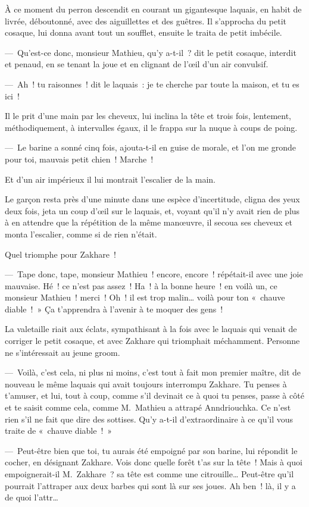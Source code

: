 \documentclass[french,twoside]{book} %
\begin{document}
À ce moment du perron descendit en courant un gigantesque laquais, en habit de livrée, déboutonné, avec des aiguillettes et des guêtres. Il s’approcha du petit cosaque, lui donna avant tout un soufflet, ensuite le traita de petit imbécile.\par
— Qu’est-ce donc, monsieur Mathieu, qu’y a-t-il ? dit le petit cosaque, interdit et penaud, en se tenant la joue et en clignant de l’œil d’un air convulsif.\par
— Ah ! tu raisonnes ! dit le laquais : je te cherche par toute la maison, et tu es ici !\par
Il le prit d’une main par les cheveux, lui inclina la tête et trois fois, lentement, méthodiquement, à intervalles égaux, il le frappa sur la nuque à coups de poing.\par
— Le barine a sonné cinq fois, ajouta-t-il en guise de morale, et l’on me gronde pour toi, mauvais petit chien ! Marche !\par
Et d’un air impérieux il lui montrait l’escalier de la main.\par
Le garçon resta près d’une minute dans une espèce d’incertitude, cligna des yeux deux fois, jeta un coup d’œil sur le laquais, et, voyant qu’il n’y avait rien de plus à en attendre que la répétition de la même manœuvre, il secoua ses cheveux et monta l’escalier, comme si de rien n’était.\par
Quel triomphe pour Zakhare !\par
— Tape donc, tape, monsieur Mathieu ! encore, encore ! répétait-il avec une joie mauvaise. Hé ! ce n’est pas assez ! Ha ! à la bonne heure ! en voilà un, ce monsieur Mathieu ! merci ! Oh ! il est trop malin… voilà pour ton « chauve diable ! » Ça t’apprendra à l’avenir à te moquer des gens !\par
La valetaille riait aux éclats, sympathisant à la fois avec le laquais qui venait de corriger le petit cosaque, et avec Zakhare qui triomphait méchamment. Personne ne s’intéressait au jeune groom.\par
— Voilà, c’est cela, ni plus ni moins, c’est tout à fait mon premier maître, dit de nouveau le même laquais qui avait toujours interrompu Zakhare. Tu penses à t’amuser, et lui, tout à coup, comme s’il devinait ce à quoi tu penses, passe à côté et te saisit comme cela, comme M. Mathieu a attrapé Anndriouchka. Ce n’est rien s’il ne fait que dire des sottises. Qu’y a-t-il d’extraordinaire à ce qu’il vous traite de « chauve diable ! »\par
— Peut-être bien que toi, tu aurais été empoigné par son barine, lui répondit le cocher, en désignant Zakhare. Vois donc quelle forêt t’as sur la tête ! Mais à quoi empoignerait-il M. Zakhare ? sa tête est comme une citrouille… Peut-être qu’il pourrait l’attraper aux deux barbes qui sont là sur ses joues. Ah ben ! là, il y a de quoi l’attr…\par
\end{document}
